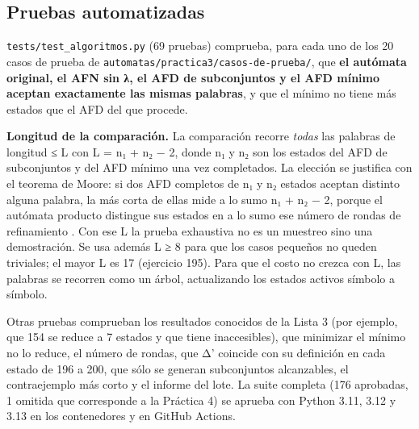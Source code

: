 
\hypertarget{pruebas-automatizadas}{%
\subsection{Pruebas automatizadas}\label{pruebas-automatizadas}}

\texttt{tests/test\_algoritmos.py} (69 pruebas) comprueba, para cada uno de los 20 casos de prueba de \texttt{automatas/practica3/casos-de-prueba/}, que \textbf{el autómata original, el AFN sin λ, el AFD de subconjuntos y el AFD mínimo aceptan exactamente las mismas palabras}, y que el mínimo no tiene más estados que el AFD del que procede.

\textbf{Longitud de la comparación.} La comparación recorre \emph{todas} las palabras de longitud ≤ L con L = n₁ + n₂ − 2, donde n₁ y n₂ son los estados del AFD de subconjuntos y del AFD mínimo una vez completados. La elección se justifica con el teorema de Moore: si dos AFD completos de n₁ y n₂ estados aceptan distinto alguna palabra, la más corta de ellas mide a lo sumo n₁ + n₂ − 2, porque el autómata producto distingue sus estados en a lo sumo ese número de rondas de refinamiento \autocites{moore1956}[sec.~4.4]{hopcroft2007}. Con ese L la prueba exhaustiva no es un muestreo sino una demostración. Se usa además L ≥ 8 para que los casos pequeños no queden triviales; el mayor L es 17 (ejercicio 195). Para que el costo no crezca con L, las palabras se recorren como un árbol, actualizando los estados activos símbolo a símbolo.

Otras pruebas comprueban los resultados conocidos de la Lista 3 (por ejemplo, que 154 se reduce a 7 estados y que tiene inaccesibles), que minimizar el mínimo no lo reduce, el número de rondas, que Δ' coincide con su definición en cada estado de 196 a 200, que sólo se generan subconjuntos alcanzables, el contraejemplo más corto y el informe del lote. La suite completa (176 aprobadas, 1 omitida que corresponde a la Práctica 4) se aprueba con Python 3.11, 3.12 y 3.13 en los contenedores y en GitHub Actions.

